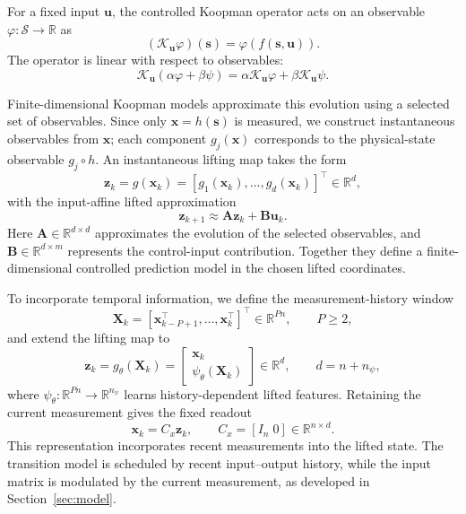 \documentclass[journal]{IEEEtran}
\newcommand{\vx}{\mathbf{x}}
\newcommand{\vu}{\mathbf{u}}
\newcommand{\vs}{\mathbf{s}}
\newcommand{\vz}{\mathbf{z}}
\newcommand{\mA}{\mathbf{A}}
\newcommand{\mB}{\mathbf{B}}
\newcommand{\mX}{\mathbf{X}}
\begin{document}
For a fixed input $\vu$, the controlled Koopman operator acts on an observable $\varphi:\mathcal S\to\mathbb R$ as \cite{koopman1931hamiltonian,mezic2005spectral,brunton2022modern}
\begin{equation}
    (\mathcal{K}_{\vu}\varphi)(\vs) = \varphi(f(\vs,\vu)).
    \label{eq:koopman_operator}
\end{equation}
The operator is linear with respect to observables:
\begin{equation}
    \mathcal{K}_{\vu}(\alpha \varphi + \beta \psi)
    = \alpha \mathcal{K}_{\vu}\varphi + \beta \mathcal{K}_{\vu}\psi.
    \label{eq:koopman_linearity}
\end{equation}

Finite-dimensional Koopman models approximate this evolution using a selected set of observables. Since only $\vx=h(\vs)$ is measured, we construct instantaneous observables from $\vx$; each component $g_j(\vx)$ corresponds to the physical-state observable $g_j\circ h$. An instantaneous lifting map takes the form
\begin{equation}
    \vz_k = g(\vx_k) = [g_1(\vx_k),\ldots,g_d(\vx_k)]^\top\in\mathbb R^d,
    \label{eq:instantaneous_lifting}
\end{equation}
with the input-affine lifted approximation
\begin{equation}
    \vz_{k+1}\approx\mA\vz_k+\mB\vu_k.
    \label{eq:linear_lifted}
\end{equation}
Here $\mA\in\mathbb R^{d\times d}$ approximates the evolution of the selected observables, and $\mB\in\mathbb R^{d\times m}$ represents the control-input contribution. Together they define a finite-dimensional controlled prediction model in the chosen lifted coordinates.

To incorporate temporal information, we define the measurement-history window
\begin{equation}
    \mX_k = [\vx_{k-P+1}^\top,\ldots,\vx_k^\top]^\top\in\mathbb R^{Pn},\qquad P\ge2,
    \label{eq:measurement_window}
\end{equation}
and extend the lifting map to
\begin{equation}
    \vz_k=g_\theta(\mX_k)=
    \begin{bmatrix}\vx_k\\\psi_\theta(\mX_k)\end{bmatrix}
    \in\mathbb R^d,\qquad d=n+n_\psi,
    \label{eq:state_preserving_lifting}
\end{equation}
where $\psi_\theta:\mathbb R^{Pn}\to\mathbb R^{n_\psi}$ learns history-dependent lifted features. Retaining the current measurement gives the fixed readout
\begin{equation}
    \vx_k=C_x\vz_k,\qquad C_x=[I_n\;0]\in\mathbb R^{n\times d}.
    \label{eq:state_readout}
\end{equation}
This representation incorporates recent measurements into the lifted state. The transition model is scheduled by recent input--output history, while the input matrix is modulated by the current measurement, as developed in Section~\ref{sec:model}.
\end{document}
